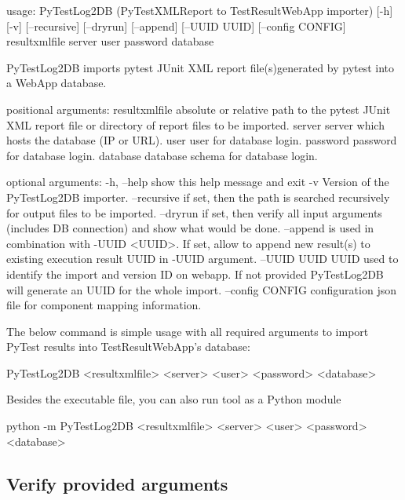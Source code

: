 \begin{robotlog}
usage: PyTestLog2DB (PyTestXMLReport to TestResultWebApp importer) [-h] [-v]
                    [--recursive] [--dryrun] [--append] [--UUID UUID]
                    [--config CONFIG] resultxmlfile server user password database

PyTestLog2DB imports pytest JUnit XML report file(s)generated by pytest into a WebApp database.

positional arguments:
resultxmlfile    absolute or relative path to the pytest JUnit XML report
                 file or directory of report files to be imported.
server           server which hosts the database (IP or URL).
user             user for database login.
password         password for database login.
database         database schema for database login.

optional arguments:
-h, --help       show this help message and exit
-v               Version of the PyTestLog2DB importer.
--recursive      if set, then the path is searched recursively for output
                 files to be imported.
--dryrun         if set, then verify all input arguments (includes DB connection)
                 and show what would be done.
--append         is used in combination with -UUID <UUID>. If set, allow to append
                 new result(s) to existing execution result UUID in -UUID argument.
--UUID UUID      UUID used to identify the import and version ID on webapp.
                 If not provided PyTestLog2DB will generate an UUID for the whole import.
--config CONFIG  configuration json file for component mapping information.
\end{robotlog}

The below command is simple usage with all required arguments to import
PyTest results into TestResultWebApp's database:

\begin{robotlog}
PyTestLog2DB <resultxmlfile> <server> <user> <password> <database>
\end{robotlog}

Besides the executable file, you can also run tool as a Python module

\begin{robotlog}
python -m PyTestLog2DB <resultxmlfile> <server> <user> <password> <database>
\end{robotlog}

\hypertarget{verify-provided-arguments}{%
\subsection{Verify provided arguments}\label{verify-provided-arguments}}

